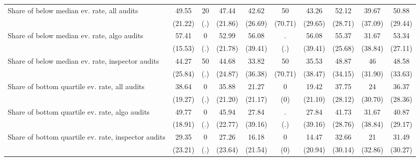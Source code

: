 {\begin{tabular}{l*{9}{c}}
Share of below median ev. rate, all audits&       49.55         &          20         &       47.44         &       42.62         &          50         &       43.26         &       52.12         &       39.67         &       50.88         \\
            &     (21.22)         &         (.)         &     (21.86)         &     (26.69)         &     (70.71)         &     (29.65)         &     (28.71)         &     (37.09)         &     (29.44)         \\
Share of below median ev. rate, algo audits&       57.41         &           0         &       52.99         &       56.08         &           .         &       56.08         &       55.37         &       31.67         &       53.34         \\
            &     (15.53)         &         (.)         &     (21.78)         &     (39.41)         &         (.)         &     (39.41)         &     (25.68)         &     (38.84)         &     (27.11)         \\
Share of below median ev. rate, inspector audits&       44.27         &          50         &       44.68         &       33.82         &          50         &       35.53         &       48.87         &          46         &       48.58         \\
            &     (25.84)         &         (.)         &     (24.87)         &     (36.38)         &     (70.71)         &     (38.47)         &     (34.15)         &     (31.90)         &     (33.63)         \\
Share of bottom quartile ev. rate, all audits&       38.64         &           0         &       35.88         &       21.27         &           0         &       19.42         &       37.75         &          24         &       36.37         \\
            &     (19.27)         &         (.)         &     (21.20)         &     (21.17)         &         (0)         &     (21.10)         &     (28.12)         &     (30.70)         &     (28.36)         \\
Share of bottom quartile ev. rate, algo audits&       49.77         &           0         &       45.94         &       27.84         &           .         &       27.84         &       41.73         &       31.67         &       40.87         \\
            &     (18.91)         &         (.)         &     (22.77)         &     (39.16)         &         (.)         &     (39.16)         &     (28.76)         &     (38.84)         &     (29.17)         \\
Share of bottom quartile ev. rate, inspector audits&       29.35         &           0         &       27.26         &       16.18         &           0         &       14.47         &       32.66         &          21         &       31.49         \\
            &     (23.21)         &         (.)         &     (23.64)         &     (21.54)         &         (0)         &     (20.94)         &     (30.14)         &     (32.86)         &     (30.27)         \\
\bottomrule
\end{tabular}
}
